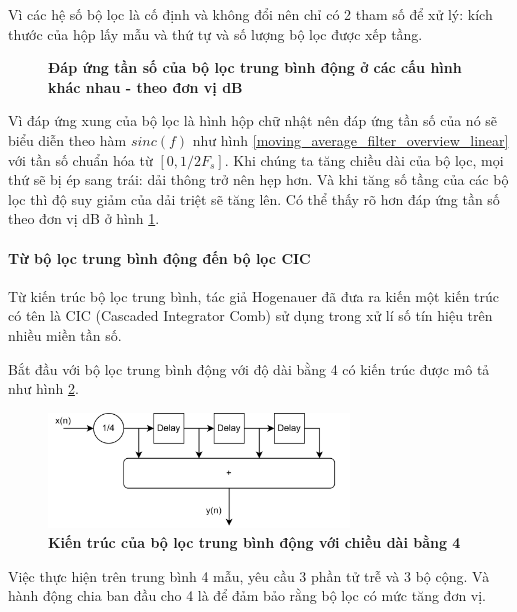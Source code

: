 Vì các hệ số bộ lọc là cố định và không đổi nên chỉ có 2 tham số để xử lý: kích thước của hộp lấy mẫu và thứ tự và số lượng bộ lọc được xếp tầng.
\begin{figure}[H]
    \centering
    
    \caption[Đáp ứng tần số của bộ lọc trung bình động ở các cấu hình khác nhau - theo đơn vị dB]{\bfseries \fontsize{12pt}{0pt}\selectfont Đáp ứng tần số của bộ lọc trung bình động ở các cấu hình khác nhau - theo đơn vị dB}
    \label{moving_average_filter_overview}
\end{figure}
Vì đáp ứng xung của bộ lọc là hình hộp chữ nhật nên đáp ứng tần số của nó sẽ biểu diễn theo hàm $sinc(f)$ như hình \ref{moving_average_filter_overview_linear} với tần số chuẩn hóa từ $[0, 1/2 F_s]$. Khi chúng ta tăng chiều dài của bộ lọc, mọi thứ sẽ bị ép sang trái: dải thông trở nên hẹp hơn. Và khi tăng số tầng của các bộ lọc thì độ suy giảm của dải triệt sẽ tăng lên. Có thể thấy rõ hơn đáp ứng tần số theo đơn vị dB ở hình \ref{moving_average_filter_overview}.

\paragraph{Từ bộ lọc trung bình động đến bộ lọc CIC}
Từ kiến trúc bộ lọc trung bình, tác giả Hogenauer đã đưa ra kiến một kiến trúc có tên là CIC (Cascaded Integrator Comb) sử dụng trong xử lí số tín hiệu trên nhiều miền tần số\cite{CIC}.

Bắt đầu với bộ lọc trung bình động với độ dài bằng 4 có kiến trúc được mô tả như hình \ref{cic_1}.
\begin{figure}[H]
    \centering
    \includegraphics[width=8cm]{Images/Chuong2/cic/cic_1.png}
    \caption[Kiến trúc của bộ lọc trung bình động với chiều dài bằng 4]{\bfseries \fontsize{12pt}{0pt}\selectfont Kiến trúc của bộ lọc trung bình động với chiều dài bằng 4}
    \label{cic_1}
\end{figure}

Việc thực hiện trên trung bình 4 mẫu, yêu cầu 3 phần tử trễ và 3 bộ cộng. Và hành động chia ban đầu cho 4 là để đảm bảo rằng bộ lọc có mức tăng đơn vị. 

